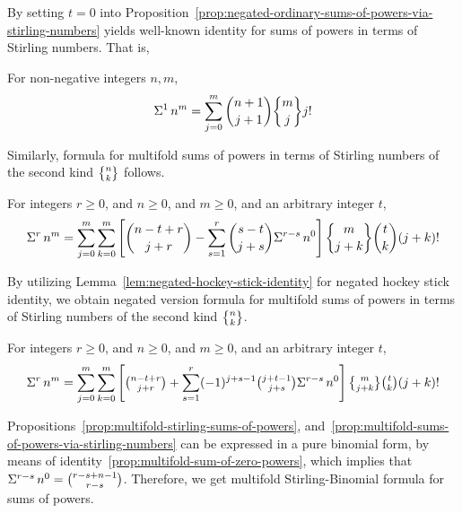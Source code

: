 By setting $t=0$ into
Proposition~\eqref{prop:negated-ordinary-sums-of-powers-via-stirling-numbers}
yields well-known identity for sums of powers in terms of Stirling numbers.
That is,
\begin{corollary}
  For non-negative integers $n,m$,
  \begin{align*}
    \KnuthRFoldSum{1}{n}{m} = \sum_{j=0}^{m} \binom{n+1}{j+1} \stirlingii{m}{j} j!
  \end{align*}
\end{corollary}

Similarly,
formula for multifold sums of
powers
in terms of Stirling numbers of the second kind $\stirlingii{n}{k}$
follows.

\begin{proposition}
  \label{prop:multifold-stirling-sums-of-powers}
  For integers $r\geq0$, and $n\geq 0$, and $m\geq 0$,
  and an arbitrary integer $t$,
  \begin{align*}
    \KnuthRFoldSum{r}{n}{m}
    = \sum_{j=0}^{m} \sum_{k=0}^{m}
    \left[ \binom{n-t+r}{j+r} - \sum_{s=1}^{r} \binom{s-t}{j+s} \KnuthRFoldSum{r-s}{n}{0} \right]
    \stirlingii{m}{j+k} \binom{t}{k} (j+k)!
  \end{align*}
\end{proposition}

By utilizing Lemma~\eqref{lem:negated-hockey-stick-identity} for
negated hockey stick identity, we obtain negated version formula for
multifold sums of powers in terms
of Stirling numbers of the second kind $\stirlingii{n}{k}$.

\begin{proposition}
  \label{prop:multifold-sums-of-powers-via-stirling-numbers}
  For integers $r\geq0$, and $n\geq 0$, and $m\geq 0$,
  and an arbitrary integer $t$,
  \begin{align*}
    \KnuthRFoldSum{r}{n}{m}
    = \sum_{j=0}^{m} \sum_{k=0}^{m}
    \left[
      \tbinom{n-t+r}{j+r}
      + \sum_{s=1}^{r} (-1)^{j+s-1}
      \tbinom{j+t-1}{j+s} \KnuthRFoldSum{r-s}{n}{0}
    \right]
    \tstirlingii{m}{j+k} \tbinom{t}{k} (j+k)!
  \end{align*}
\end{proposition}

Propositions~\eqref{prop:multifold-stirling-sums-of-powers},
and~\eqref{prop:multifold-sums-of-powers-via-stirling-numbers}
can be expressed in a pure binomial form,
by means of identity~\eqref{prop:multifold-sum-of-zero-powers},
which implies that
$\Sigma^{r-s}\,{n}^{0} = \binom{r-s+n-1}{r-s}$.
Therefore, we get multifold Stirling-Binomial formula for sums of powers.

